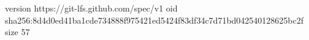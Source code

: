 version https://git-lfs.github.com/spec/v1
oid sha256:8d4d0ed41ba1cde734888f975421ed5424f83df34c7d71bd042540128625bc2f
size 57
